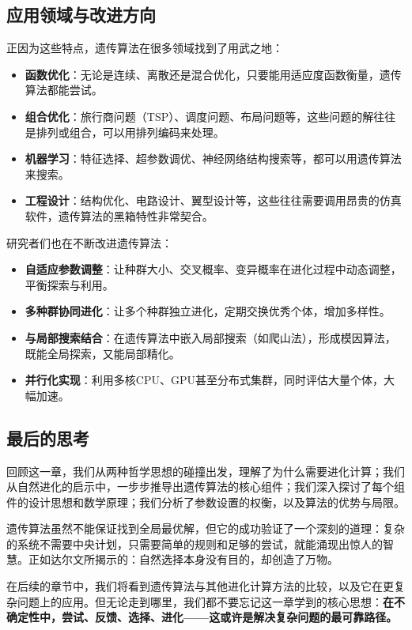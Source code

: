 \documentclass[lang=cn,zihao=-4,a4paper,fontset=windows]{beautybook}
\begin{document}
\subsection{应用领域与改进方向}

正因为这些特点，遗传算法在很多领域找到了用武之地：

\begin{itemize}
    \item \textbf{函数优化}：无论是连续、离散还是混合优化，只要能用适应度函数衡量，遗传算法都能尝试。
    \item \textbf{组合优化}：旅行商问题（TSP）、调度问题、布局问题等，这些问题的解往往是排列或组合，可以用排列编码来处理。
    \item \textbf{机器学习}：特征选择、超参数调优、神经网络结构搜索等，都可以用遗传算法来搜索。
    \item \textbf{工程设计}：结构优化、电路设计、翼型设计等，这些往往需要调用昂贵的仿真软件，遗传算法的黑箱特性非常契合。
\end{itemize}

研究者们也在不断改进遗传算法：

\begin{itemize}
    \item \textbf{自适应参数调整}：让种群大小、交叉概率、变异概率在进化过程中动态调整，平衡探索与利用。
    \item \textbf{多种群协同进化}：让多个种群独立进化，定期交换优秀个体，增加多样性。
    \item \textbf{与局部搜索结合}：在遗传算法中嵌入局部搜索（如爬山法），形成模因算法，既能全局探索，又能局部精化。
    \item \textbf{并行化实现}：利用多核CPU、GPU甚至分布式集群，同时评估大量个体，大幅加速。
\end{itemize}

\subsection{最后的思考}

回顾这一章，我们从两种哲学思想的碰撞出发，理解了为什么需要进化计算；我们从自然进化的启示中，一步步推导出遗传算法的核心组件；我们深入探讨了每个组件的设计思想和数学原理；我们分析了参数设置的权衡，以及算法的优势与局限。

遗传算法虽然不能保证找到全局最优解，但它的成功验证了一个深刻的道理：复杂的系统不需要中央计划，只需要简单的规则和足够的尝试，就能涌现出惊人的智慧。正如达尔文所揭示的：自然选择本身没有目的，却创造了万物。

在后续的章节中，我们将看到遗传算法与其他进化计算方法的比较，以及它在更复杂问题上的应用。但无论走到哪里，我们都不要忘记这一章学到的核心思想：\textbf{在不确定性中，尝试、反馈、选择、进化——这或许是解决复杂问题的最可靠路径。}
\end{document}
